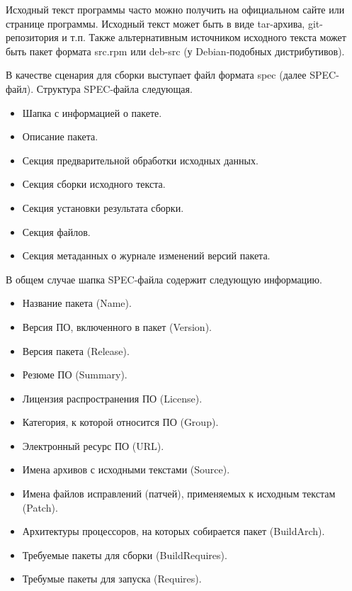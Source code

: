 \documentclass[bachelor, och, pract]{SCWorks}
\begin{document}
Исходный текст программы часто можно получить на официальном сайте или странице программы.
Исходный текст может быть в виде tar-архива, git-репозитория и т.п.
Также альтернативным источником исходного текста может быть пакет формата src.rpm или deb-src (у Debian-подобных дистрибутивов)\cite{a_rpm}.

В качестве сценария для сборки выступает файл формата spec (далее SPEC-файл).
Структура SPEC-файла следующая.
\begin{itemize}                                                                           
    \item Шапка с информацией о пакете.                          
    \item Описание пакета.              
    \item Секция предварительной обработки исходных данных.
    \item Секция сборки исходного текста.
    \item Секция установки результата сборки.
    \item Секция файлов.
    \item Секция метаданных о журнале изменений версий пакета.
\end{itemize}

В общем случае шапка SPEC-файла содержит следующую информацию.
\begin{itemize}                                                                                      
    \item Название пакета (Name).                                                              
    \item Версия ПО, включенного в пакет (Version).                                                                           
    \item Версия пакета (Release).                                          
    \item Резюме ПО (Summary).                                                            
    \item Лицензия распространения ПО (License).                   
    \item Категория, к которой относится ПО (Group).
    \item Электронный ресурс ПО (URL). 
    \item Имена архивов с исходными текстами (Source).
    \item Имена файлов исправлений (патчей), применяемых к исходным текстам (Patch).
    \item Архитектуры процессоров, на которых собирается пакет (BuildArch).
    \item Требуемые пакеты для сборки (BuildRequires).
    \item Требумые пакеты для запуска (Requires).
\end{itemize}
\end{document}
